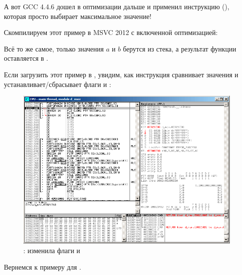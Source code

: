 

А вот GCC 4.4.6 дошел в оптимизации дальше и применил инструкцию  (), которая просто выбирает максимальное значение!



\clearpage
{}

Скомпилируем этот пример в MSVC 2012 с включенной оптимизацией:



Всё то же самое, только значения $a$ и $b$ 
берутся из стека, а результат функции оставляется в .

Если загрузить этот пример в \olly, 
увидим, как инструкция  сравнивает значения и устанавливает/сбрасывает
флаги \CF и \PF:

\begin{figure}[H]
\centering
\includegraphics[scale=\FigScale]{patterns/205_floating_SIMD/d_max_olly.png}
\caption{\olly:  изменила флаги \CF и \PF}
\label{fig:FPU_SIMD_d_max_olly}
\end{figure}

\label{machine_epsilon_x64_and_SIMD}

Вернемся к примеру  для \Tdouble {}.

